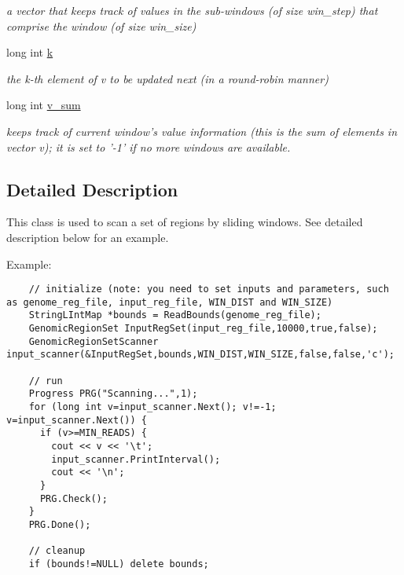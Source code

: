 \begin{CompactItemize}
\begin{CompactList}\small\item\em a vector that keeps track of values in the sub-windows (of size win\_\-step) that comprise the window (of size win\_\-size) \item\end{CompactList}\item 
\hypertarget{classGenomicRegionSetScanner_fa341bbfce6cffdc2880c8f1c80abeb1}{
long int \hyperlink{classGenomicRegionSetScanner_fa341bbfce6cffdc2880c8f1c80abeb1}{k}}
\label{classGenomicRegionSetScanner_fa341bbfce6cffdc2880c8f1c80abeb1}

\begin{CompactList}\small\item\em the k-th element of v to be updated next (in a round-robin manner) \item\end{CompactList}\item 
\hypertarget{classGenomicRegionSetScanner_80be27fad3a3456e7aecd71fb7439c5a}{
long int \hyperlink{classGenomicRegionSetScanner_80be27fad3a3456e7aecd71fb7439c5a}{v\_\-sum}}
\label{classGenomicRegionSetScanner_80be27fad3a3456e7aecd71fb7439c5a}

\begin{CompactList}\small\item\em keeps track of current window's value information (this is the sum of elements in vector v); it is set to '-1' if no more windows are available. \item\end{CompactList}\end{CompactItemize}


\subsection{Detailed Description}
This class is used to scan a set of regions by sliding windows. See detailed description below for an example. 

Example: 

\begin{Code}\begin{verbatim}    // initialize (note: you need to set inputs and parameters, such as genome_reg_file, input_reg_file, WIN_DIST and WIN_SIZE)
    StringLIntMap *bounds = ReadBounds(genome_reg_file);
    GenomicRegionSet InputRegSet(input_reg_file,10000,true,false);
    GenomicRegionSetScanner input_scanner(&InputRegSet,bounds,WIN_DIST,WIN_SIZE,false,false,'c');

    // run
    Progress PRG("Scanning...",1);
    for (long int v=input_scanner.Next(); v!=-1; v=input_scanner.Next()) {
      if (v>=MIN_READS) {
        cout << v << '\t';
        input_scanner.PrintInterval();
        cout << '\n';
      }
      PRG.Check();
    }
    PRG.Done();
  
    // cleanup
    if (bounds!=NULL) delete bounds;
\end{verbatim}
\end{Code}

